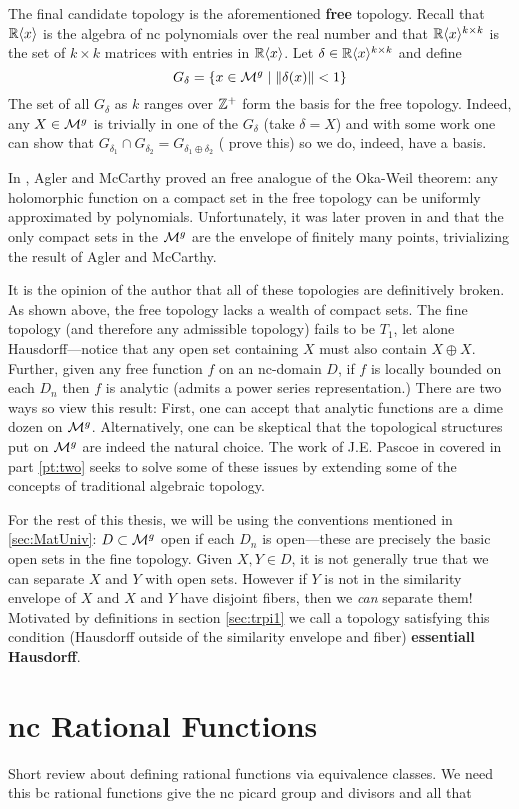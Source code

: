 The final candidate topology is the aforementioned \textbf{free} topology.
Recall that \(\mathbb{R} \langle x \rangle \) is the algebra of nc polynomials over the
real number and that
\(\mathbb{R} \langle x \rangle ^{k\times k}\) is the set of \(k \times k\) matrices
with entries in \(\mathbb{R} \langle x \rangle \). Let
\(\delta \in \mathbb{R} \langle x \rangle ^{k\times k}\) and define
\[
  G_\delta = \{x \in \mathcal{M}^{g} \mid \| \delta(x) \| <1\}
\]
The set of all \(G_\delta\) as \(k\) ranges over \(\mathbb{Z} ^+\) form the basis for
the free topology. Indeed, any \(X \in \mathcal{M}^{g} \) is trivially in one of the
\(G_\delta\) (take \(\delta=X\)) and with some work one can show that
\(G_{\delta_1} \cap G_{\delta_2}= G_{\delta_1\oplus \delta_2}\) ({\color{red}
  prove this}) so we do,
indeed, have a basis.

In \cite{aglerGlobal2013}, Agler and McCarthy proved an free analogue of the
Oka-Weil theorem: any holomorphic function on a compact set in the free topology
can be uniformly approximated by polynomials. Unfortunately, it was later proven
in \cite{pascoeentire2019} and \cite{augatCompact2017} that the only compact
sets in the \(\mathcal{M}^{g} \) are the envelope of finitely many points, trivializing
the result of Agler and McCarthy.

It is the opinion of the author that all of these topologies are definitively
broken. As shown above, the free topology lacks a wealth of compact sets.
The fine topology (and therefore any admissible topology)
fails to be \(T_1\), let alone Hausdorff---notice that any open set containing
\(X\) must also contain \(X\oplus X\). Further, given any free function \(f\)
on an nc-domain \(D\), if \(f\) is locally bounded on each \(D_n\) then \(f\)
is analytic (admits a power series representation.) There are two ways so view
this result: First, one can accept that analytic functions are a dime dozen on
\(\mathcal{M}^{g} \). Alternatively, one can be skeptical that the topological
structures put on \(\mathcal{M}^{g} \) are indeed the natural choice. The work of J.E.
Pascoe in \cite{pascoeFreeNoncommutativePrincipal2020} covered in part
\ref{pt:two} seeks to solve some of these issues by extending some of the
concepts of traditional algebraic topology.

For the rest of this thesis, we will be using the conventions mentioned in
\cref{sec:MatUniv}: \( D \subset\mathcal{M}^{g} \) open if each \(D_n\) is open---these
are precisely the basic open sets in the fine topology.
Given \(X,Y \in D\), it is not generally true that we can separate \(X\) and
\(Y\) with open sets. However if \(Y\) is not in the similarity envelope of
\(X\) and \(X\) and \(Y\) have disjoint fibers, then we \emph{can} separate
them! Motivated by definitions in section \ref{sec:trpi1} we call a topology
satisfying this condition (Hausdorff outside of the similarity envelope and
fiber) \textbf{essentiall Hausdorff}.

\section{nc Rational Functions}%
\label{sec:ncrational}

{\color{blue} Short review about defining rational functions via equivalence
  classes. We need this bc rational functions give the nc picard group and
  divisors and all that }
